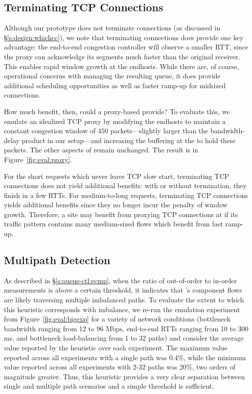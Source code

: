 \subsection{Terminating TCP Connections}\label{s:eval:proxy}

Although our \name prototype does not terminate connections (as discussed in \S\ref{s:design:whichcc}), we note that terminating connections does provide one key advantage: the end-to-end congestion controller will observe a smaller RTT, since the proxy can acknowledge its segments much faster than the original receiver. 
This enables rapid window growth at the endhosts.
While there are, of course, operational concerns with managing the resulting queue, it does provide additional scheduling opportunities as well as faster ramp-up for midsized connections.

How much benefit, then, could a proxy-based \name provide?
To evaluate this, we emulate an idealized TCP proxy by modifying the endhosts to maintain a constant congestion window of $450$ packets---slightly larger than the bandwidth-delay product in our setup---and increasing the buffering at the \inbox to hold these packets. 
The other aspects of \name remain unchanged.
The result is in Figure~\ref{fig:eval:proxy}. 

For the short requests which never leave TCP slow start, terminating TCP connections does not yield additional benefits: with or without termination, they finish in a few RTTs.
For medium-to-long requests, terminating TCP connections yields additional benefits since they no longer incur the penalty of window growth.
Therefore, a site may benefit from proxying TCP connections at \name if its traffic pattern contains many medium-sized flows which benefit from fast ramp-up.



\subsection{Multipath Detection}\label{s:eval:ecmp}

As described in \S\ref{s:queue-ctl:ecmp}, when the ratio of out-of-order to in-order measurements is above a certain threshold, it indicates that \name's component flows are likely traversing multiple imbalanced paths. To evaluate the extent to which this heuristic corresponds with imbalance, we re-run the emulation experiment from Figure~\ref{fig:eval:bigexp} for a variety of network conditions (bottleneck bandwidth ranging from 12 to 96 Mbps, end-to-end RTTs ranging from 10 to 300 ms, and bottleneck load-balancing from 1 to 32 paths) and consider the average value reported by the heuristic over each experiment. The maximum value reported across all experiments with a single path was 0.4\%, while the minimum value reported across all experiments with 2-32 paths was 20\%, two orders of magnitude greater. Thus, this heuristic provides a very clear separation between single and multiple path scenarios and a simple threshold is sufficient. 


